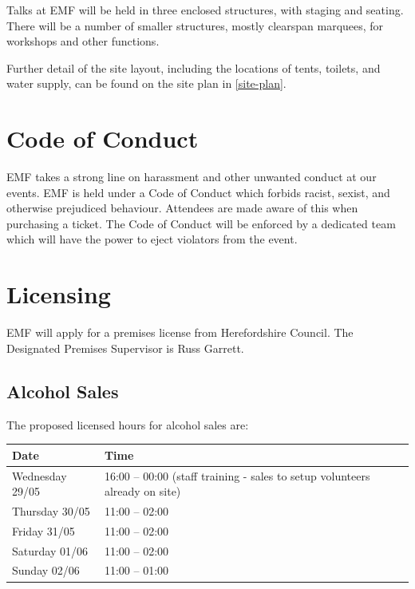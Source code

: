 Talks at EMF will be held in three enclosed structures, with staging and
seating. There will be a number of smaller structures, mostly clearspan marquees,
for workshops and other functions.

Further detail of the site layout, including the locations of tents, toilets,
and water supply, can be found on the site plan in \cref{site-plan}.

\section{Code of Conduct}

EMF takes a strong line on harassment and other unwanted conduct at our events. EMF
is held under a Code of Conduct which forbids racist, sexist, and otherwise prejudiced
behaviour. Attendees are made aware of this when purchasing a ticket. The Code of Conduct
will be enforced by a dedicated team which will have the power to eject violators
from the event.

\newpage

\section{Licensing}

EMF will apply for a premises license from Herefordshire Council.
The Designated Premises Supervisor is Russ Garrett.

\subsection{Alcohol Sales}

The proposed licensed hours for alcohol sales are:

\begin{table}[h!]
    \centering
    \begin{tabular}{| l l |}
        \hline
        \textbf{Date}   & \textbf{Time}                                                               \\
        \hline
        Wednesday 29/05 & 16:00 -- 00:00 (staff training - sales to setup volunteers already on site) \\
        Thursday 30/05  & 11:00 -- 02:00                                                              \\
        Friday 31/05    & 11:00 -- 02:00                                                              \\
        Saturday 01/06  & 11:00 -- 02:00                                                              \\
        Sunday 02/06    & 11:00 -- 01:00                                                              \\
        \hline
    \end{tabular}
    \centering
\end{table}

